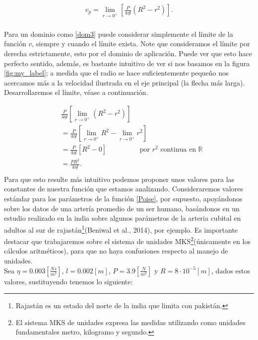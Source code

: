  \begin{align*}
     v_{p}=\lim\limits_{r \to 0^+}\left[\frac{P}{4\eta l}\left(R^2-r^2\right)\right].\\
 \end{align*}
 
 Para un dominio como \ref{dom3} puede considerar simplemente el límite de la función $v$, siempre y cuando el límite exista. Note que consideramos el límite por derecha estrictamente, esto por el dominio de aplicación. Puede ver que esto hace perfecto sentido, además, es bastante intuitivo de ver si nos basamos en la figura \ref{fig:my_label}; a medida que el radio se hace suficientemente pequeño nos acercamos más a la velocidad ilustrada en el eje principal (la flecha más larga). Desarrollaremos el límite, véase a continuación.
 
  \begin{align*}
     &\frac{P}{4\eta l}\left[\lim\limits_{r \to 0^+}\left(R^2-r^2\right)\right]\\
     &=\frac{P}{4\eta l}\left[\lim\limits_{r \to 0^+}R^2-\lim\limits_{r \to 0^+}r^2\right]\\
     &=\frac{P}{4\eta l}\left[R^2-0\right] \hspace{1cm} \hspace{1cm} \text{por $r^2$ continua en $\mathbb{R}$}\\
     &=\frac{PR^2}{4\eta l}.\\
 \end{align*}
 Para que esto resulte más intuitivo podemos proponer unos valores para las constantes de nuestra función que estamos analizando. Consideraremos valores estándar para los parámetros de la función \ref{Poise}, por supuesto, apoyándonos sobre los datos de una artería promedio de un ser humano, basándonos en un estudio realizado en la india sobre algunos parámetros de la arteria cubital en adultos al sur de rajastán\footnote{Rajastán es un estado del norte de la india que limita con pakistán.}(Beniwal et al., 2014), por ejemplo. Es importante destacar que trabajaremos sobre el sistema de unidades MKS\footnote{El sistema MKS de unidades expresa las medidas utilizando como unidades fundamentales metro, kilogramo y segundo.}(únicamente en los cálculos aritméticos), para que no haya confusiones respecto al manejo de unidades.\\
 
 Sea $\eta=0.003\left[\frac{Ns}{m^2}\right]$, $l=0.002\left[m\right]$, $P=3.9\left[\frac{N}{m^2}\right]$ y $R=8\cdot10^{-5}\left[m\right]$, dados estos valores, sustituyendo tenemos lo siguiente:
 
